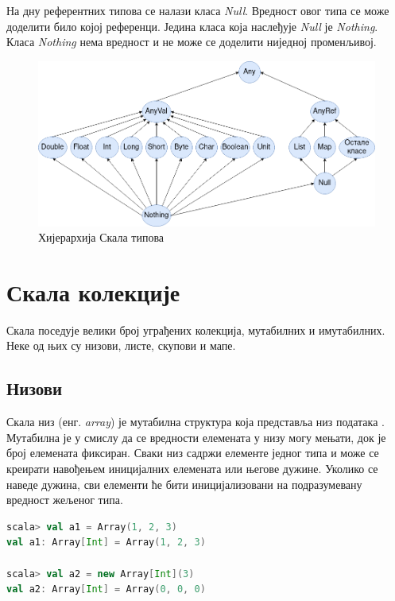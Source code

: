 \documentclass[12pt,oneside]{memoir}
\begin{document}
На дну референтних типова се налази класа \textit{Null}. Вредност овог типа се може доделити било којој референци. Једина класа која наслеђује \textit{Null} је \textit{Nothing}. Класа \textit{Nothing} нема вредност и не може се доделити ниједној променљивој.

\begin{figure}[!ht]
  \centering
  \includegraphics[width=1\textwidth]{pictures/scala_hier.png}
  \caption{Хијерархија Скала типова}
  \label{fig:scala_types_hier}
\end{figure}

\section{Скала колекције}
\label{sec:scala_coll}

Скала поседује велики број уграђених колекција, мутабилних и имутабилних. Неке од њих су низови, листе, скупови и мапе.

\subsection{Низови}
\label{subsec:scala_arrays}

Скала низ (енг. \textit{array}) је мутабилна структура која представља низ података \cite{scala_prog}. Мутабилна је у смислу да се вредности елемената у низу могу мењати, док је број елемената фиксиран. Сваки низ садржи елементе једног типа и може се креирати навођењем иницијалних елемената или његове дужине. Уколико се наведе дужина, сви елементи ће бити иницијализовани на подразумевану вредност жељеног типа.

\begin{lstlisting}[language=Scala, caption={Инстанцирање низа у Скали}, label={lst:scala_coll_array_example}]
scala> val a1 = Array(1, 2, 3)
val a1: Array[Int] = Array(1, 2, 3)

scala> val a2 = new Array[Int](3)
val a2: Array[Int] = Array(0, 0, 0)
\end{lstlisting}
\end{document}
